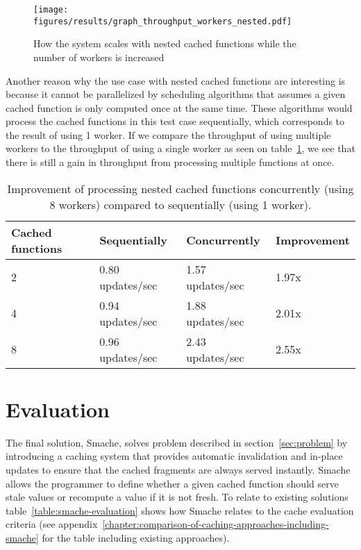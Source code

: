 \begin{figure*}[ht!]
  \centering
  \texttt{[image: figures/results/graph\_throughput\_workers\_nested.pdf]}
  \caption{How the system scales with nested cached functions while the number of workers is increased}
  \label{fig:graph_throughput_workers_nested}
\end{figure*}

Another reason why the use case with nested cached functions are interesting is because it cannot be parallelized by scheduling algorithms that assumes a given cached function is only computed once at the same time. These algorithms would process the cached functions in this test case sequentially, which corresponds to the result of using 1 worker. If we compare the throughput of using multiple workers to the throughput of using a single worker as seen on table~\ref{tab:nested-relative-results}, we see that there is still a gain in throughput from processing multiple functions at once.

\begin{table}[ht!]
  \centering
  \begin{tabular}{llll}
    \hline
    Cached functions & Sequentially & Concurrently & Improvement \\
    \hline
    2 & 0.80 updates/sec & 1.57 updates/sec & 1.97x \\
    4 & 0.94 updates/sec & 1.88 updates/sec & 2.01x \\
    8 & 0.96 updates/sec & 2.43 updates/sec & 2.55x \\
    \hline
  \end{tabular}
  \caption{Improvement of processing nested cached functions concurrently (using 8 workers) compared to sequentially (using 1 worker).}
  \label{tab:nested-relative-results}
\end{table}

\section{Evaluation}
\label{sec:evaluation}

The final solution, Smache, solves problem described in section~\ref{sec:problem} by introducing a caching system that provides automatic invalidation and in-place updates to ensure that the cached fragments are always served instantly. Smache allows the programmer to define whether a given cached function should serve stale values or recompute a value if it is not fresh. To relate to existing solutions table~\ref{table:smache-evaluation} shows how Smache relates to the cache evaluation criteria (see appendix~\ref{chapter:comparison-of-caching-approaches-including-smache} for the table including existing approaches).

